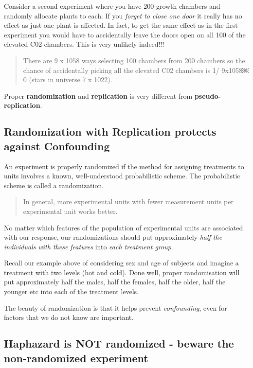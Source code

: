 \documentclass[
]{book}
\begin{document}
Consider a second experiment where you have 200 growth chambers and randomly allocate plants to each. If you \emph{forget to close one door} it really has no effect as just one plant is affected. In fact, to get the same effect as in the first experiment you would have to accidentally leave the doors open on all 100 of the elevated C02 chambers. This is very unlikely indeed!!!

\begin{quote}
There are 9 x 1058 ways selecting 100 chambers from 200 chambers so the chance of accidentally picking all the elevated C02 chambers is 1/ 9x1058￼0 (stars in universe 7 x 1022).
\end{quote}

Proper \textbf{randomization} and \textbf{replication} is very different from \textbf{pseudo-replication}.

\hypertarget{randomization-with-replication-protects-against-confounding}{%
\subsection{Randomization with Replication protects against Confounding}\label{randomization-with-replication-protects-against-confounding}}

An experiment is properly randomized if the method for assigning treatments to units involves a known, well-understood probabilistic scheme. The probabilistic scheme is called a randomization.

\begin{quote}
In general, more experimental units with fewer measurement units per experimental unit works better.
\end{quote}

No matter which features of the population of experimental units are associated with our response, our randomizations should put approximately \emph{half the individuals with these features} into \emph{each treatment group}.

Recall our example above of considering sex and age of subjects and imagine a treatment with two levels (hot and cold). Done well, proper randomisation will put approximately half the males, half the females, half the older, half the younger etc into each of the treatment levels.

The beauty of randomization is that it helps prevent \emph{confounding}, even for factors that we do not know are important.

\hypertarget{haphazard-is-not-randomized---beware-the-non-randomized-experiment}{%
\subsection{\texorpdfstring{\textbf{Haphazard} is NOT randomized - beware the non-randomized experiment}{Haphazard is NOT randomized - beware the non-randomized experiment}}\label{haphazard-is-not-randomized---beware-the-non-randomized-experiment}}
\end{document}
